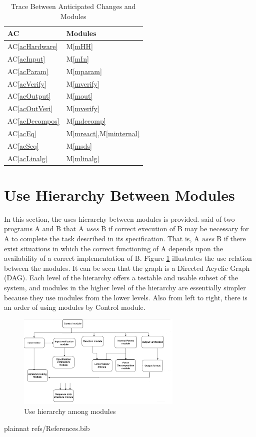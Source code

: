 \documentclass[12pt, titlepage]{article}
\newcommand{\acref}[1]{AC\ref{#1}}
\newcommand{\mref}[1]{M\ref{#1}}
\begin{document}
\begin{table}[H]
\centering
\begin{tabular}{p{} p{}}
\toprule
\textbf{AC} & \textbf{Modules}\\
\midrule
\acref{acHardware} & \mref{mHH}\\
\acref{acInput} & \mref{mIn}\\
\acref{acParam} & \mref{mparam}\\
\acref{acVerify} & \mref{mverify}\\
\acref{acOutput} & \mref{mout}\\
\acref{acOutVeri} & \mref{mverify}\\
\acref{acDecompos} & \mref{mdecomp}\\
\acref{acEq} & \mref{mreact},\mref{minternal}\\
\acref{acSeq} & \mref{msds}\\
\acref{acLinalg} & \mref{mlinalg}\\
\bottomrule
\end{tabular}
\caption{Trace Between Anticipated Changes and Modules}
\label{TblACT}
\end{table}

\section{Use Hierarchy Between Modules} \label{SecUse}

In this section, the uses hierarchy between modules is
provided. \citet{Parnas1978} said of two programs A and B that A {\em uses} B if
correct execution of B may be necessary for A to complete the task described in
its specification. That is, A {\em uses} B if there exist situations in which
the correct functioning of A depends upon the availability of a correct
implementation of B.  Figure \ref{FigUH} illustrates the use relation between
the modules. It can be seen that the graph is a Directed Acyclic Graph
(DAG). Each level of the hierarchy offers a testable and usable subset of the
system, and modules in the higher level of the hierarchy are essentially simpler
because they use modules from the lower levels. Also from left to right, there is an order of using modules by Control module.

\begin{figure}[H]
\centering
\includegraphics[width=0.7\textwidth]{mg.png}
\caption{Use hierarchy among modules}
\label{FigUH}
\end{figure}


 {plainnat}
 {refs/References.bib}

\newpage{}
\end{document}
